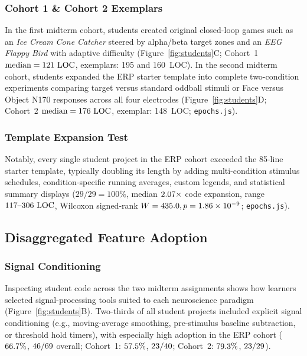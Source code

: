 \documentclass[11pt]{article}
\begin{document}
\subsubsection{Cohort 1 \& Cohort 2 Exemplars}
In the first midterm cohort, students created original closed-loop games such as an \emph{Ice Cream Cone Catcher} steered by alpha/beta target zones and an \emph{EEG Flappy Bird} with adaptive difficulty (Figure~\ref{fig:students}C; Cohort~1 $\text{median} = 121\text{ LOC}$, exemplars: 195 and 160~LOC). In the second midterm cohort, students expanded the ERP starter template into complete two-condition experiments comparing target versus standard oddball stimuli or Face versus Object N170 responses across all four electrodes (Figure~\ref{fig:students}D; Cohort~2 $\text{median} = 176\text{ LOC}$, exemplar: 148~LOC; \texttt{epochs.js}).

\subsubsection{Template Expansion Test}
Notably, every single student project in the ERP cohort exceeded the 85-line starter template, typically doubling its length by adding multi-condition stimulus schedules, condition-specific running averages, custom legends, and statistical summary displays ($29/29 = 100\%$, median $2.07\times$ code expansion, range $117\text{--}306\text{ LOC}$, Wilcoxon signed-rank $W = 435.0, p = 1.86 \times 10^{-9}$; \texttt{epochs.js}).

\subsection{Disaggregated Feature Adoption}

\subsubsection{Signal Conditioning}
Inspecting student code across the two midterm assignments shows how learners selected signal-processing tools suited to each neuroscience paradigm (Figure~\ref{fig:students}B). Two-thirds of all student projects included explicit signal conditioning (e.g., moving-average smoothing, pre-stimulus baseline subtraction, or threshold hold timers), with especially high adoption in the ERP cohort ($66.7\%$, $46/69$ overall; Cohort~1: $57.5\%$, $23/40$; Cohort~2: $79.3\%$, $23/29$).
\end{document}
